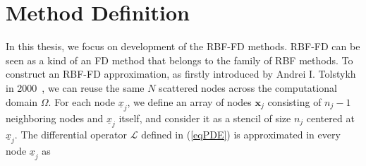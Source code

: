 \documentclass{UUThesisTemplate}
\begin{document}
%
\section{Method Definition}

\par
In this thesis, we focus on development of the RBF-FD methods. RBF-FD can be seen as a kind of an FD method that belongs to the family of RBF methods. To construct an RBF-FD approximation, as firstly introduced by Andrei I. Tolstykh in 2000~\cite{tolstykh2000using}, we can reuse the same $N$ scattered nodes across the computational domain $\Omega$. For each node $\underline{x}_j$, we define an array of nodes $\mathbf{x}_j$ consisting of $n_j-1$ neighboring nodes and $\underline{x}_j$ itself, and consider it as a stencil of size $n_j$ centered at $\underline{x}_j$. The differential operator $\mathcal{L}$ defined in (\ref{eqPDE})  is approximated in every node  $\underline{x}_j$ as
\end{document}

